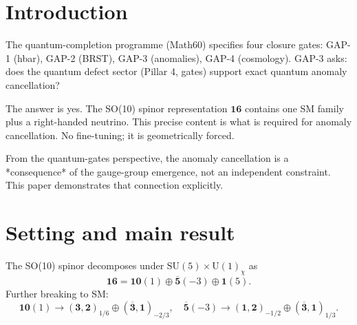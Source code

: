 \maketitle

\section{Introduction}
The quantum-completion programme (Math60) specifies four closure gates:
GAP-1 (hbar), GAP-2 (BRST), GAP-3 (anomalies), GAP-4 (cosmology). GAP-3
asks: does the quantum defect sector (Pillar 4, gates) support exact
quantum anomaly cancellation?

The answer is yes. The SO(10) spinor representation $\mathbf{16}$ contains
one SM family plus a right-handed neutrino. This precise content is what is
required for anomaly cancellation. No fine-tuning; it is geometrically
forced.

From the quantum-gates perspective, the anomaly cancellation is a
*consequence* of the gauge-group emergence, not an independent constraint.
This paper demonstrates that connection explicitly.

\section{Setting and main result}
The SO(10) spinor decomposes under
$\mathrm{SU}(5)\times \mathrm{U}(1)_\chi$ as
\begin{equation}
\mathbf{16} = \mathbf{10}(1) \oplus \overline{\mathbf{5}}(-3) \oplus \mathbf{1}(5).
\end{equation}
Further breaking to SM:
\begin{equation}
\mathbf{10}(1) \to (\mathbf{3}, \mathbf{2})_{1/6} \oplus (\overline{\mathbf{3}}, \mathbf{1})_{-2/3},
\quad \overline{\mathbf{5}}(-3) \to (\mathbf{1}, \mathbf{2})_{-1/2} \oplus (\overline{\mathbf{3}}, \mathbf{1})_{1/3}.
\end{equation}

